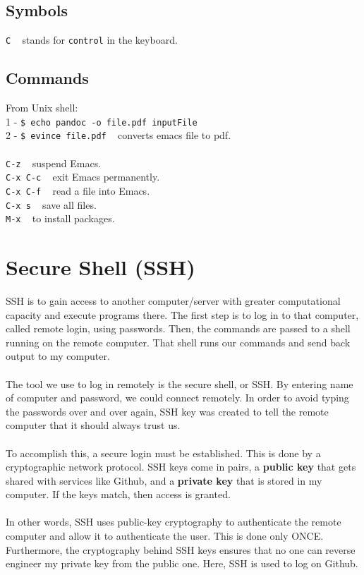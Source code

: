 \documentclass{article}
\begin{document}
{{\subsection{Symbols}
\texttt{C} ~ stands for \texttt{control} in the keyboard.

\subsection{Commands}
From Unix shell:\\
1 - \texttt{\$ echo pandoc -o file.pdf inputFile}\\
2 - \texttt{\$ evince file.pdf} ~ converts emacs file to pdf.\\
\\
\texttt{C-z} ~ suspend Emacs.\\
\texttt{C-x C-c} ~ exit Emacs permanently.\\
\texttt{C-x C-f} ~ read a file into Emacs.\\
\texttt{C-x s} ~ save all files.\\
\texttt{M-x} ~ to install packages. \\

\newpage
\section{Secure Shell (SSH)}

SSH is to gain access to another computer/server with greater computational capacity and execute programs there. The first step is to log in to that computer, called remote login, using passwords. Then, the commands are passed to a shell running on the remote computer. That shell runs our commands and send back output to my computer. \\
\\
The tool we use to log in remotely is the secure shell, or SSH. By entering name of computer and password, we could connect remotely. In order to avoid typing the passwords over and over again, SSH key was created to tell the remote computer that it should always trust us. \\
\\
To accomplish this, a secure login must be established. This is done by a cryptographic network protocol. SSH keys come in pairs, a \textbf{public key} that gets shared with services like Github, and a \textbf{private key} that is stored in my computer. If the keys match, then access is granted. \\
\\
In other words, SSH uses public-key cryptography to authenticate  the remote computer and allow it to authenticate the user. This is done only ONCE. Furthermore, the cryptography behind SSH keys ensures that no one can reverse engineer my private key from the public one. Here, SSH is used to log on Github.\\


}}
\end{document}
